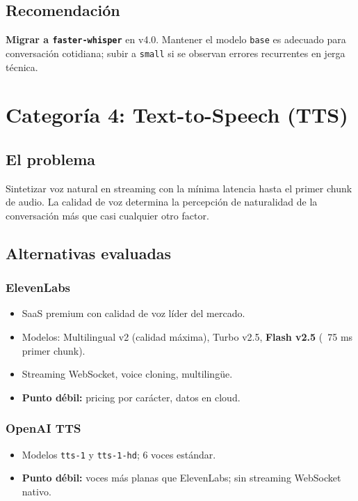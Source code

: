 \documentclass[11pt,a4paper]{article}
\begin{document}
\subsection{Recomendación}

\textbf{Migrar a \texttt{faster-whisper}} en v4.0. Mantener el modelo \texttt{base} es adecuado para conversación cotidiana; subir a \texttt{small} si se observan errores recurrentes en jerga técnica.

\newpage

\section{Categoría 4: Text-to-Speech (TTS)}

\subsection{El problema}

Sintetizar voz natural en streaming con la mínima latencia hasta el primer chunk de audio. La calidad de voz determina la percepción de naturalidad de la conversación más que casi cualquier otro factor.

\subsection{Alternativas evaluadas}

\subsubsection{ElevenLabs}
\begin{itemize}[leftmargin=*,itemsep=0pt]
\item SaaS premium con calidad de voz líder del mercado.
\item Modelos: Multilingual v2 (calidad máxima), Turbo v2.5, \textbf{Flash v2.5} (~75 ms primer chunk).
\item Streaming WebSocket, voice cloning, multilingüe.
\item \textbf{Punto débil:} pricing por carácter, datos en cloud.
\end{itemize}

\subsubsection{OpenAI TTS}
\begin{itemize}[leftmargin=*,itemsep=0pt]
\item Modelos \texttt{tts-1} y \texttt{tts-1-hd}; 6 voces estándar.
\item \textbf{Punto débil:} voces más planas que ElevenLabs; sin streaming WebSocket nativo.
\end{itemize}
\end{document}
